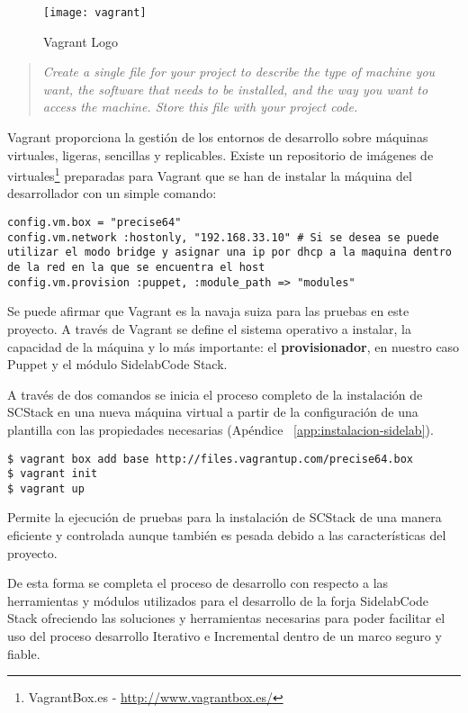 \begin{figure}[H]
    \centering
    \texttt{[image: vagrant]}
    \caption{Vagrant Logo}
    \label{fir:vagrant}
\end{figure}

\begin{quote}
    \emph{Create a single file for your project to describe the type of machine you want, the software that needs to be installed, and the way you want to access the machine. Store this file with your project code.}
\end{quote}

\par Vagrant proporciona la gestión de los entornos de desarrollo sobre máquinas virtuales, ligeras, sencillas y replicables. Existe un repositorio de imágenes de virtuales\footnote{VagrantBox.es - \url{http://www.vagrantbox.es/}} preparadas para Vagrant que se han de instalar la máquina del desarrollador con un simple comando:

\lstset{style=bashbasico}
\begin{lstlisting}[frame=trbl]
config.vm.box = "precise64"
config.vm.network :hostonly, "192.168.33.10" # Si se desea se puede utilizar el modo bridge y asignar una ip por dhcp a la maquina dentro de la red en la que se encuentra el host
config.vm.provision :puppet, :module_path => "modules"
\end{lstlisting}

\par Se puede afirmar que Vagrant es la navaja suiza para las pruebas en este proyecto. A través de Vagrant se define el sistema operativo a instalar, la capacidad de la máquina y lo más importante: el \textbf{provisionador}, en nuestro caso Puppet y el módulo SidelabCode Stack.

\par A través de dos comandos se inicia el proceso completo de la instalación de SCStack en una nueva máquina virtual a partir de la configuración de una plantilla con las propiedades necesarias (Apéndice ~\ref{app:instalacion-sidelab}).

\lstset{style=bashbasico}
\begin{lstlisting}[frame=trbl]
$ vagrant box add base http://files.vagrantup.com/precise64.box
$ vagrant init
$ vagrant up
\end{lstlisting}

\par Permite la ejecución de pruebas para la instalación de SCStack de una manera eficiente y controlada aunque también es pesada debido a las características del proyecto.

\par De esta forma se completa el proceso de desarrollo con respecto a las herramientas y módulos utilizados para el desarrollo de la forja SidelabCode Stack ofreciendo las soluciones y herramientas necesarias para poder facilitar el uso del proceso desarrollo Iterativo e Incremental dentro de un marco seguro y fiable.


